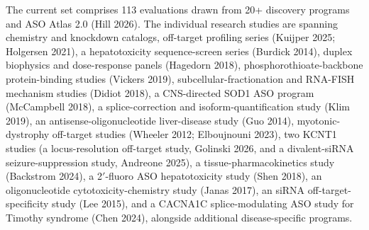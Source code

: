 \documentclass[11pt]{article}
\begin{document}
The current set comprises 113 evaluations drawn from 20+ discovery programs and ASO Atlas 2.0 (Hill 2026). The individual research studies are spanning chemistry and knockdown catalogs, off-target profiling series (Kuijper 2025; Holgersen 2021), a hepatotoxicity sequence-screen series (Burdick 2014), duplex biophysics and dose-response panels (Hagedorn 2018), phosphorothioate-backbone protein-binding studies (Vickers 2019), subcellular-fractionation and RNA-FISH mechanism studies (Didiot 2018), a CNS-directed SOD1 ASO program (McCampbell 2018), a splice-correction and isoform-quantification study (Klim 2019), an antisense-oligonucleotide liver-disease study (Guo 2014), myotonic-dystrophy off-target studies (Wheeler 2012; Elboujnouni 2023), two KCNT1 studies (a locus-resolution off-target study, Golinski 2026, and a divalent-siRNA seizure-suppression study, Andreone 2025), a tissue-pharmacokinetics study (Backstrom 2024), a 2$'$-fluoro ASO hepatotoxicity study (Shen 2018), an oligonucleotide cytotoxicity-chemistry study (Janas 2017), an siRNA off-target-specificity study (Lee 2015), and a CACNA1C splice-modulating ASO study for Timothy syndrome (Chen 2024), alongside additional disease-specific programs.
\clearpage
\end{document}
